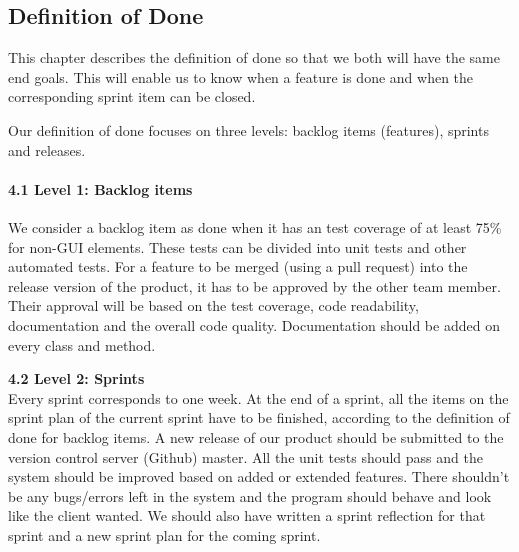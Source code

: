 \subsection{Definition of Done}
This chapter describes the definition of done so that we both will have the same end goals. This will enable us to know when a feature is done and when the corresponding sprint item can be closed.

Our definition of done focuses on three levels: backlog items (features), sprints and releases.

\paragraph{4.1 Level 1: Backlog items} 
We consider a backlog item as done when it has an test coverage of at least 75\% for non-GUI elements. These tests can be divided into unit tests and other automated tests. For a feature to be merged (using a pull request) into the release version of the product, it has to be approved by the other team member. Their approval will be based on the test coverage, code readability, documentation and the overall code quality. Documentation should be added on every class and method. 

\textbf{4.2 Level 2: Sprints} \\
Every sprint corresponds to one week. At the end of a sprint, all the items on the sprint plan of the current sprint have to be finished, according to the definition of done for backlog items. A new release of our product should be submitted to the version control server (Github) master. All the unit tests should pass and the system should be improved based on added or extended features. There shouldn't be any bugs/errors left in the system and the program should behave and look like the client wanted. We should also have written a sprint reflection for that sprint and a new sprint plan for the coming sprint. 

